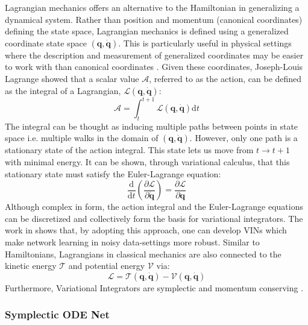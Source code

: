 \documentclass{article}
\begin{document}
Lagrangian mechanics offers an alternative to the Hamiltonian in generalizing a dynamical system. Rather than position and momentum (canonical coordinates) defining the state space, Lagrangian mechanics is defined using a generalized coordinate state space $(\mathbf{q},\dot{\mathbf{q}})$. This is particularly useful in physical settings where the description and measurement of generalized coordinates may be easier to work with than canonical coordinates \cite{marsden_discrete_2001}. Given these coordinates, Joseph-Louis Lagrange showed that a scalar value $\mathcal{A}$, referred to as the action, can be defined as the integral of a Lagrangian, $\mathcal{L}(\mathbf{q},\dot{\mathbf{q}})$:
\begin{equation}
\mathcal{A} = \int_{t}^{t+1} \mathcal{L}(\mathbf{q},\dot{\mathbf{q}}) \mathrm{d}t
\label{eqn.action_integral}
\end{equation}
The integral can be thought as inducing multiple paths between points in state space i.e. multiple walks in the domain of $(\mathbf{q},\mathbf{\dot{q}})$. However, only one path is a stationary state of the action integral. This state lets us move from $t \rightarrow t+1$ with minimal energy. It can be shown, through variational calculus, that this stationary state must satisfy the Euler-Lagrange equation:
\begin{equation}
\frac{\mathrm{d} }{\mathrm{d}t} \left ( \frac{\partial \mathcal{L}}{\partial \dot{\mathbf{q}}} \right )= \frac{\partial \mathcal{L}}{\partial \mathbf{q}}
\label{eqn.euler_lagrange}
\end{equation}
Although complex in form, the action integral and the Euler-Lagrange equations can be discretized and collectively form the basis for variational integrators. The work in \cite{saemundsson_variational_2019} shows that, by adopting this approach, one can develop VINs which make network learning in noisy data-settings more robust. Similar to Hamiltonians, Lagrangians in classical mechanics are also connected to the kinetic energy $\mathcal{T}$ and potential energy $\mathcal{V}$ via:
\begin{equation}
\mathcal{L} = \mathcal{T}(\mathbf{q},\mathbf{\dot{q}}) - \mathcal{V} (\mathbf{q},\mathbf{\dot{q}})
\end{equation}
Furthermore, Variational Integrators are symplectic and momentum conserving \cite{lew_overview_nodate}.

\subsubsection{Symplectic ODE Net}
\end{document}
